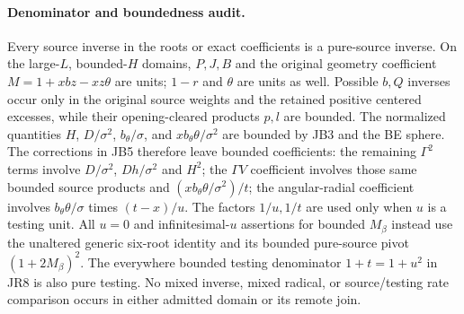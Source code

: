 \paragraph{Denominator and boundedness audit.}
Every source inverse in the roots or exact coefficients is a pure-source
inverse. On the large-$L$, bounded-$H$ domains, $P,J,B$ and the original
geometry coefficient $M=1+xbz-xz\theta$ are units; $1-r$ and $\theta$
are units as well. Possible $b,Q$ inverses occur only in the original
source weights and the retained positive centered excesses, while their
opening-cleared products $p,l$ are bounded. The normalized quantities
$H$, $D/\sigma^2$, $b_\theta/\sigma$, and
$xb_\theta\theta/\sigma^2$ are bounded by JB3 and the BE sphere.
The corrections in JB5 therefore leave bounded coefficients: the
remaining $\Gamma^2$ terms involve $D/\sigma^2$, $Dh/\sigma^2$ and
$H^2$; the $\Gamma V$ coefficient involves those same bounded source
products and $(xb_\theta\theta/\sigma^2)/t$; the angular-radial
coefficient involves $b_\theta\theta/\sigma$ times $(t-x)/u$.
The factors $1/u,1/t$ are used only when $u$ is a testing unit.
All $u=0$ and infinitesimal-$u$ assertions for bounded $M_\beta$
instead use the unaltered generic six-root identity and its bounded
pure-source pivot $(1+2M_\beta)^2$. The everywhere bounded testing
denominator $1+t=1+u^2$ in JR8 is also pure testing. No mixed inverse,
mixed radical, or source/testing rate comparison occurs in either
admitted domain or its remote join.
